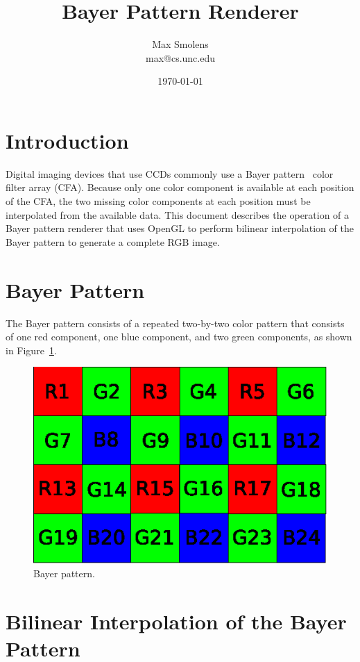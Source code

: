 \documentclass[11pt,letterpaper]{article}
\author{Max Smolens\\ max@cs.unc.edu}
\date{\today}
\title{Bayer Pattern Renderer}
\begin{document}
\maketitle
\section{Introduction}

Digital imaging devices that use CCDs commonly use a Bayer
pattern~\cite{bayer_patent} color filter array (CFA).  Because only
one color component is available at each position of the CFA, the two
missing color components at each position must be interpolated from
the available data.  This document describes the operation of a Bayer
pattern renderer that uses OpenGL to perform bilinear interpolation of
the Bayer pattern to generate a complete RGB image.
\section{Bayer Pattern}

The Bayer pattern consists of a repeated two-by-two color pattern that
consists of one red component, one blue component, and two green
components, as shown in Figure~\ref{fig:bayer_pattern}.

\begin{figure}
\centering
\includegraphics{bayer_pattern}
\caption{Bayer pattern.}
\label{fig:bayer_pattern}
\end{figure}
\section{Bilinear Interpolation of the Bayer Pattern}
\end{document}
